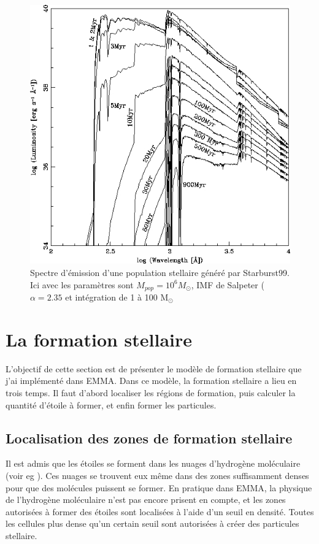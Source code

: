 \begin{figure}
        \includegraphics[width=.95\linewidth]{img/03/spectre_starburst.jpg} 
        \caption[Spectres Starburst99]{Spectre d'émission d'une population stellaire généré par Starburst99.
        Ici avec les paramètres sont $M_{pop}=10^6 M_\odot$, \ac{IMF} de Salpeter ($\alpha=2.35$ et intégration de 1 à 100 M$_\odot$ 
 		\label{fig:spectre_starburst}}
\end{figure}

\clearpage
\section{La formation stellaire}

L'objectif de cette section est de présenter le modèle de formation stellaire que j'ai implémenté dans EMMA.
Dans ce modèle, la formation stellaire a lieu en trois temps.
Il faut d'abord localiser les régions de formation, puis calculer la quantité d'étoile à former, et enfin former les particules.
 
\subsection{Localisation des zones de formation stellaire}

Il est admis que les étoiles se forment dans les nuages d'hydrogène moléculaire (voir eg \cite{krumholz_universal_2012}).
Ces nuages se trouvent eux même dans des zones suffisamment denses pour que des molécules puissent se former.
En pratique dans EMMA, la physique de l'hydrogène moléculaire n'est pas encore prisent en compte, et les zones autorisées à former des étoiles sont localisées à l'aide d'un seuil en densité.
Toutes les cellules plus dense qu'un certain seuil sont autorisées à créer des particules stellaire.

